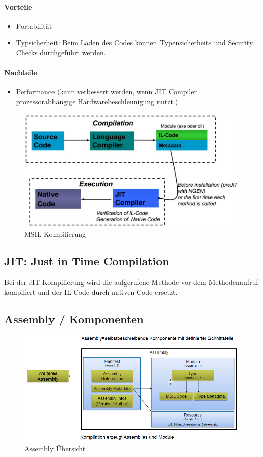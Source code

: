 \paragraph{Vorteile}
\begin{itemize}
	\item Portabilität
	\item Typsicherheit: Beim Laden des Codes können Typensicherheits und Security Checks durchgeführt werden.
\end{itemize}
\paragraph{Nachteile}
\begin{itemize}
	\item Performance (kann verbessert werden, wenn JIT Compiler prozessorabhängige Hardwarebeschleunigung nutzt.)
\end{itemize}

\begin{figure}[h]
\centering
\includegraphics[width=0.5\linewidth]{images/msil_compilation}
\caption{MSIL Kompilierung}
\label{fig:msilcompilation}
\end{figure}

\subsection{JIT: Just in Time Compilation}
Bei der JIT Kompilierung wird die aufgerufene Methode vor dem Methodenaufruf kompiliert und der IL-Code durch nativen Code ersetzt.

\subsection{Assembly / Komponenten}
\begin{figure}[h!]
\centering
\includegraphics[width=0.7\linewidth]{images/assembly}
\caption{Assembly Übersicht}
\label{fig:assembly}
\end{figure}

